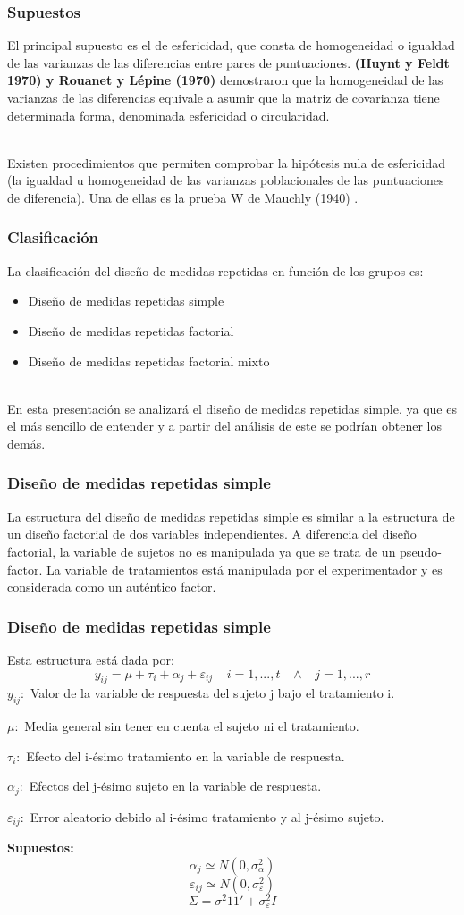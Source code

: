 \documentclass[12pt]{beamer}
\begin{document}
\begin{frame}
\frametitle{Supuestos}
El principal supuesto es el de esfericidad, que consta de homogeneidad o igualdad de las
varianzas de las diferencias entre pares de puntuaciones. \textbf{(Huynt y Feldt 1970) y Rouanet y
Lépine (1970)} demostraron que la homogeneidad de las varianzas de las diferencias equivale a
asumir que la matriz de covarianza tiene determinada forma, denominada esfericidad o
circularidad.

~\\Existen procedimientos que permiten comprobar la hipótesis nula de
esfericidad (la igualdad u homogeneidad de las varianzas poblacionales de las puntuaciones de
diferencia). Una de ellas es la prueba W de Mauchly (1940) .
\end{frame}

\begin{frame}
\frametitle{Clasificación}
La clasificación del diseño de medidas repetidas en función de los grupos es:
\begin{itemize}
\item Diseño de medidas repetidas simple
\item Diseño de medidas repetidas factorial
\item Diseño de medidas repetidas factorial mixto
\end{itemize}
~\\En esta presentación se analizará el diseño de medidas repetidas simple, ya que es el más sencillo de entender y a partir del análisis de este se podrían obtener los demás.
\end{frame}

\begin{frame}
\frametitle{Diseño de medidas repetidas simple}
La estructura del diseño de medidas repetidas simple es similar a la estructura de un diseño
factorial de dos variables independientes. A diferencia del diseño factorial, la variable de sujetos no
es manipulada ya que se trata de un pseudo-factor. La variable de tratamientos está manipulada
por el experimentador y es considerada como un auténtico factor.
\end{frame}

\begin{frame}
\frametitle{Diseño de medidas repetidas simple}
Esta estructura está dada por:
$$y_{ij}=\mu+\tau_i+\alpha_j+\varepsilon_{ij} \;\;\;\; i=1,...,t \;\;\;  \wedge \;\;\; j=1,...,r$$
$y_{ij}:$ Valor de la variable de respuesta del sujeto j bajo el tratamiento i.

$\mu:$ Media general sin tener en cuenta el sujeto ni el tratamiento.

$\tau_i:$ Efecto del i-ésimo tratamiento en la variable de respuesta.

$\alpha_j:$ Efectos del j-ésimo sujeto en la variable de respuesta.

$\varepsilon_{ij}:$ Error aleatorio debido al i-ésimo tratamiento y al j-ésimo sujeto.

\textbf{Supuestos:} 
$$\alpha_j \simeq N(0,\sigma^2_\alpha)$$
$$\varepsilon_{ij} \simeq N(0,\sigma^2_\varepsilon)$$
$$\Sigma =\sigma^2 11' + \sigma^2_\varepsilon I$$
\end{frame}
\end{document}

